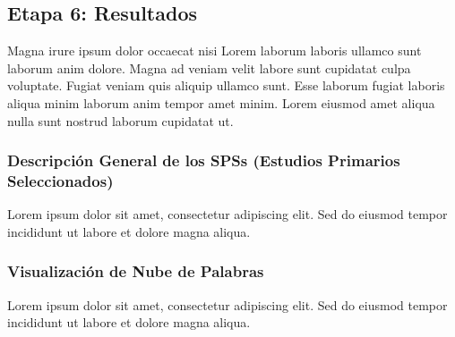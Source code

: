 \subsection{Etapa 6: Resultados}
Magna irure ipsum dolor occaecat nisi Lorem laborum laboris ullamco sunt laborum anim dolore. Magna ad veniam velit labore sunt cupidatat culpa voluptate. Fugiat veniam quis aliquip ullamco sunt. Esse laborum fugiat laboris aliqua minim laborum anim tempor amet minim. Lorem eiusmod amet aliqua nulla sunt nostrud laborum cupidatat ut.
\mbox{}\\

\subsubsection{Descripción General de los SPSs (Estudios Primarios Seleccionados)}
Lorem ipsum dolor sit amet, consectetur adipiscing elit. Sed do eiusmod tempor incididunt ut labore et dolore magna aliqua.
\mbox{}\\

\subsubsection{Visualización de Nube de Palabras}
Lorem ipsum dolor sit amet, consectetur adipiscing elit. Sed do eiusmod tempor incididunt ut labore et dolore magna aliqua.
\mbox{}\\